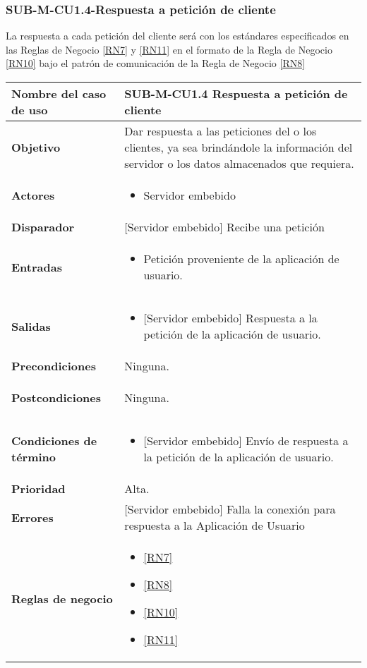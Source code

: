 \subsubsection{SUB-M-CU1.4-Respuesta a petición de cliente}\label{SUB-M-CU1.4}
La respuesta a cada petición del cliente será con los estándares especificados en las Reglas de Negocio \ref{RN7} y \ref{RN11} en el formato de la Regla de Negocio \ref{RN10} bajo el patrón de comunicación de la Regla de Negocio \ref{RN8}

\begin{longtable}{|J{5cm}|J{10.3cm}|}
	\hline
	\textbf{Nombre del caso de uso} &
		SUB-M-CU1.4 Respuesta a petición de cliente\\ \hline
	\textbf{Objetivo} &
		Dar respuesta a las peticiones del o los clientes, ya sea brindándole la información del servidor o los datos almacenados que requiera. \\ \hline
	\textbf{Actores} &
		\begin{itemize}
		    \item Servidor embebido
		\end{itemize}\\ \hline 
	\textbf{Disparador} & 
	     {[Servidor embebido]} Recibe una petición\\ \hline 
	\textbf{Entradas} & 
		\begin{itemize}
				\item Petición proveniente de la aplicación de usuario.
		\end{itemize}\\ \hline 
	\textbf{Salidas} & 
		\begin{itemize}
			\item {[Servidor embebido]} Respuesta a la petición de la aplicación de usuario.
		\end{itemize} \\ \hline
	\textbf{Precondiciones} &
		Ninguna.\\ \hline
	\textbf{Postcondiciones} &
		\begin{itemize}
			Ninguna.
		\end{itemize}\\ \hline
	\textbf{Condiciones de término} & 
		\begin{itemize}
			\item {[Servidor embebido]} Envío de respuesta a la petición de la aplicación de usuario.
		\end{itemize} \\ \hline 
	\textbf{Prioridad} & 
		Alta. \\ \hline
	\textbf{Errores} & 
	    \item {[Servidor embebido]} Falla la conexión para respuesta a la Aplicación de Usuario
		\\ \hline
	\textbf{Reglas de negocio} & 
		\begin{itemize}
			\item \ref{RN7}
			\item \ref{RN8}
			\item \ref{RN10}
			\item \ref{RN11}
		\end{itemize} \\ \hline

\end{longtable}

